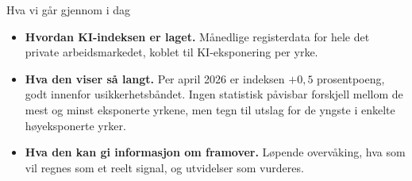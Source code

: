 
\begin{frame}{Hva vi går gjennom i dag}
\begin{itemize}\setlength{\itemsep}{12pt}
  \item \textbf{Hvordan KI-indeksen er laget.} Månedlige registerdata for hele det private arbeidsmarkedet, koblet til KI-eksponering per yrke.
  \item \textbf{Hva den viser så langt.} Per april 2026 er indeksen $+0{,}5$ prosentpoeng, godt innenfor usikkerhetsbåndet. Ingen statistisk påvisbar forskjell mellom de mest og minst eksponerte yrkene, men tegn til utslag for de yngste i enkelte høyeksponerte yrker.
  \item \textbf{Hva den kan gi informasjon om framover.} Løpende overvåking, hva som vil regnes som et reelt signal, og utvidelser som vurderes.
\end{itemize}
\end{frame}
